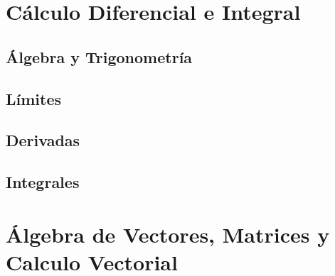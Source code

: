 \documentclass[12pt]{article}
\begin{document}
\begin{appendices}
\section{C\'alculo Diferencial e Integral}
 \subsection{\'Algebra y Trigonometr\'ia}
 \subsection{L\'imites}
 \subsection{Derivadas}
 \subsection{Integrales}
\section{\'Algebra de Vectores, Matrices y Calculo Vectorial}
\end{appendices}
\end{document}
